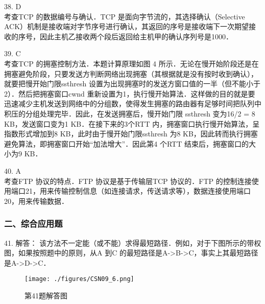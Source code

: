 38. D \\
考查TCP 的数据编号与确认．TCP 是面向字节流的，其选择确认（Selective ACK）机制是接收端对字节序号进行确认，其返回的序号是接收端下一次期望接收的序号，因此主机乙接收两个段后返回给主机甲的确认序列号是1000．

39. C \\
考查TCP 的拥塞控制方法．本题计算原理如图 4 所示．无论在慢开始阶段还是在拥塞避免阶段，只要发送方判断网络出现拥塞（其根据就是没有按时收到确认），就要把慢开始门限ssthresh 设置为出现拥塞时的发送方窗口值的一半（但不能小于2）．然后把拥塞窗口cwnd 重新设置为1，执行慢开始算法．这样做的目的就是要迅速减少主机发送到网络中的分组数，使得发生拥塞的路由器有足够时间把队列中积压的分组处理完毕．因此，在发送拥塞后，慢开始门限 ssthresh 变为16/2 = 8 KB，发送窗口变为1 KB．在接下来的3个RTT 内，拥塞窗口执行慢开始算法，呈指数形式增加到8 KB，此时由于慢开始门限ssthresh 为8 KB，因此转而执行拥塞避免算法，即拥塞窗口开始“加法增大”．因此第4 个RTT 结束后，拥塞窗口的大小为9 KB．

40. A \\
考查FTP 协议的特点．FTP 协议是基于传输层TCP 协议的．FTP 的控制连接使用端口21，用来传输控制信息（如连接请求，传送请求等），数据连接使用端口20，用来传输数据．

\subsubsection{二、综合应用题}
41. 解答：
该方法不一定能（或不能）求得最短路径．例如，对于下图所示的带权图，如果按照题中的原则，从A 到C 的最短路径是A->B->C，事实上其最短路径是A->D->C．
\begin{figure}[ht]
\centering
\texttt{[image: ./figures/CSN09\_6.png]}
\caption{第41题解答图} \label{CSN09_fig6}
\end{figure}

